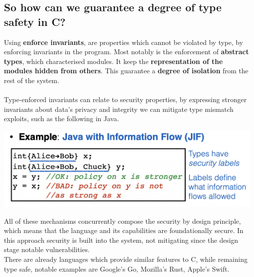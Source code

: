 \documentclass[11pt, oneside]{article}   	%
\begin{document}
\subsection*{So how can we guarantee a degree of type safety in C?}
Using \textbf{enforce invariants}, are properties which cannot be violated by type, by enforcing invariants in the program. Most notably is the enforcement of \textbf{abstract types}, which characterised modules. It keep the \textbf{representation of the modules hidden from others}. This guarantee a \textbf{degree of isolation} from the rest of the system.\\\\
Type-enforced invariants can relate to security properties, by expressing stronger invariants about data's privacy and integrity we can mitigate type mismatch exploits, such as the following in Java.
\begin{center}
\includegraphics[scale = 0.6]{alice}
\end{center}
All of these mechanisms concurrently compose the security by design principle, which means that the language and its capabilities are foundationally secure. In this approach security is built into the system, not mitigating since the design stage notable vulnerabilities.\\
There are already languages which provide similar features to C, while remaining type safe, notable examples are Google's Go, Mozilla's Rust, Apple's Swift.
\end{document}
